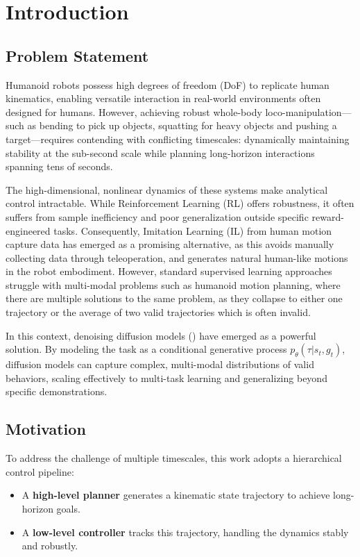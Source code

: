 
\section{Introduction}\label{introduction}

\subsection{Problem Statement}\label{introduction-problem-statement}

Humanoid robots possess high degrees of freedom (DoF) to replicate human kinematics, enabling versatile interaction in real-world environments often designed for humans. However, achieving robust whole-body loco-manipulation—such as bending to pick up objects, squatting for heavy objects and pushing a target—requires contending with conflicting timescales: dynamically maintaining stability at the sub-second scale while planning long-horizon interactions spanning tens of seconds.

The high-dimensional, nonlinear dynamics of these systems make analytical control intractable. While Reinforcement Learning (RL) offers robustness, it often suffers from sample inefficiency and poor generalization outside specific reward-engineered tasks. Consequently, Imitation Learning (IL) from human motion capture data has emerged as a promising alternative, as this avoids manually collecting data through teleoperation, and generates natural human-like motions in the robot embodiment. However, standard supervised learning approaches struggle with multi-modal problems such as humanoid motion planning, where there are multiple solutions to the same problem, as they collapse to either one trajectory or the average of two valid trajectories which is often invalid.

In this context, denoising diffusion models (\cite{wolf2025diffusion, tevet2023human}) have emerged as a powerful solution. By modeling the task as a conditional generative process $p_\theta(\tau|s_t,g_t)$, diffusion models can capture complex, multi-modal distributions of valid behaviors, scaling effectively to multi-task learning and generalizing beyond specific demonstrations.

\subsection{Motivation}\label{motivation}

To address the challenge of multiple timescales, this work adopts a hierarchical control pipeline:
\begin{itemize}
    \item A \textbf{high-level planner} generates a kinematic state trajectory to achieve long-horizon goals.
    \item A \textbf{low-level controller} tracks this trajectory, handling the dynamics stably and robustly.
\end{itemize}

